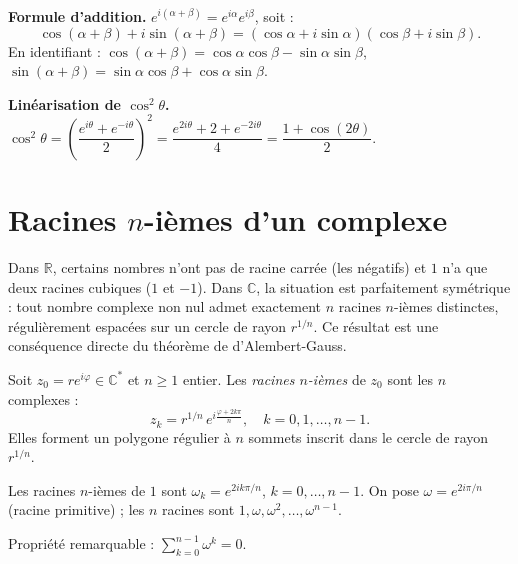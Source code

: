 \documentclass[11pt,a4paper,twoside]{book}
\newcommand{\R}{\mathbb{R}}
\newcommand{\C}{\mathbb{C}}
\begin{document}
\begin{exemplebox}
\textbf{Formule d'addition.} $e^{i(\alpha+\beta)} = e^{i\alpha}e^{i\beta}$, soit :
\[ \cos(\alpha+\beta)+i\sin(\alpha+\beta) = (\cos\alpha+i\sin\alpha)(\cos\beta+i\sin\beta). \]
En identifiant : $\cos(\alpha+\beta) = \cos\alpha\cos\beta - \sin\alpha\sin\beta$,
$\sin(\alpha+\beta) = \sin\alpha\cos\beta + \cos\alpha\sin\beta$.

\textbf{Linéarisation de $\cos^2\theta$.}
$\cos^2\theta = \left(\dfrac{e^{i\theta}+e^{-i\theta}}{2}\right)^2
= \dfrac{e^{2i\theta}+2+e^{-2i\theta}}{4} = \dfrac{1+\cos(2\theta)}{2}$.
\end{exemplebox}

\section{Racines $n$-ièmes d'un complexe}

Dans $\R$, certains nombres n'ont pas de racine carrée (les négatifs) et $1$ n'a que deux racines cubiques ($1$ et $-1$). Dans $\C$, la situation est parfaitement symétrique : tout nombre complexe non nul admet exactement $n$ racines $n$-ièmes distinctes, régulièrement espacées sur un cercle de rayon $r^{1/n}$. Ce résultat est une conséquence directe du théorème de d'Alembert-Gauss.

\begin{theoremebox}
Soit $z_0 = r e^{i\varphi} \in \C^*$ et $n \geq 1$ entier.
Les \emph{racines $n$-ièmes} de $z_0$ sont les $n$ complexes :
\[
  z_k = r^{1/n}\, e^{i\frac{\varphi + 2k\pi}{n}}, \quad k = 0, 1, \ldots, n-1.
\]
Elles forment un polygone régulier à $n$ sommets inscrit dans le cercle de rayon $r^{1/n}$.
\end{theoremebox}

\begin{definitionbox}
Les racines $n$-ièmes de $1$ sont $\omega_k = e^{2ik\pi/n}$, $k=0,\ldots,n-1$.
On pose $\omega = e^{2i\pi/n}$ (racine primitive) ; les $n$ racines sont $1, \omega, \omega^2, \ldots, \omega^{n-1}$.

Propriété remarquable : $\displaystyle\sum_{k=0}^{n-1}\omega^k = 0$.
\end{definitionbox}
\end{document}
